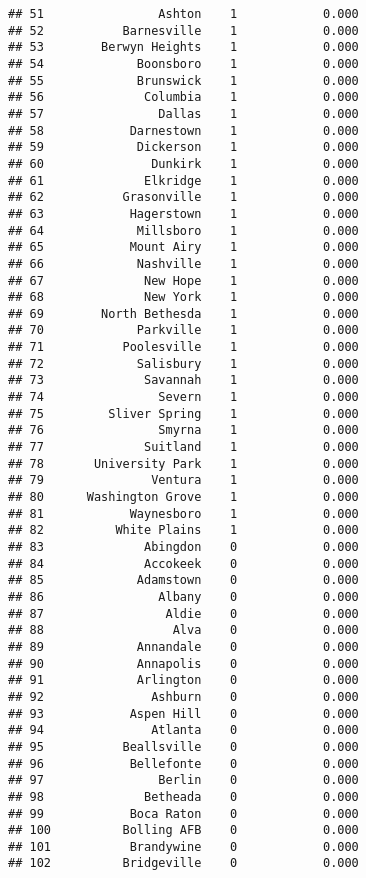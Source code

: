 \documentclass[]{article}
\begin{document}
\begin{verbatim}
## 51                Ashton    1            0.000
## 52           Barnesville    1            0.000
## 53        Berwyn Heights    1            0.000
## 54             Boonsboro    1            0.000
## 55             Brunswick    1            0.000
## 56              Columbia    1            0.000
## 57                Dallas    1            0.000
## 58            Darnestown    1            0.000
## 59             Dickerson    1            0.000
## 60               Dunkirk    1            0.000
## 61              Elkridge    1            0.000
## 62           Grasonville    1            0.000
## 63            Hagerstown    1            0.000
## 64             Millsboro    1            0.000
## 65            Mount Airy    1            0.000
## 66             Nashville    1            0.000
## 67              New Hope    1            0.000
## 68              New York    1            0.000
## 69        North Bethesda    1            0.000
## 70             Parkville    1            0.000
## 71           Poolesville    1            0.000
## 72             Salisbury    1            0.000
## 73              Savannah    1            0.000
## 74                Severn    1            0.000
## 75         Sliver Spring    1            0.000
## 76                Smyrna    1            0.000
## 77              Suitland    1            0.000
## 78       University Park    1            0.000
## 79               Ventura    1            0.000
## 80      Washington Grove    1            0.000
## 81            Waynesboro    1            0.000
## 82          White Plains    1            0.000
## 83              Abingdon    0            0.000
## 84              Accokeek    0            0.000
## 85             Adamstown    0            0.000
## 86                Albany    0            0.000
## 87                 Aldie    0            0.000
## 88                  Alva    0            0.000
## 89             Annandale    0            0.000
## 90             Annapolis    0            0.000
## 91             Arlington    0            0.000
## 92               Ashburn    0            0.000
## 93            Aspen Hill    0            0.000
## 94               Atlanta    0            0.000
## 95           Beallsville    0            0.000
## 96            Bellefonte    0            0.000
## 97                Berlin    0            0.000
## 98              Betheada    0            0.000
## 99            Boca Raton    0            0.000
## 100          Bolling AFB    0            0.000
## 101           Brandywine    0            0.000
## 102          Bridgeville    0            0.000

\end{verbatim}
\end{document}
